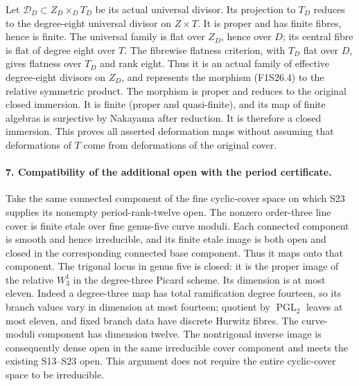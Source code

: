 Let $\mathcal D_D\subset Z_D\times_D T_D$ be its actual
universal divisor. Its projection to $T_D$ reduces to
the degree-eight universal divisor on $Z\times T$.
It is proper and has finite fibres, hence is finite.
The universal family is flat over $Z_D$, hence over $D$;
its central fibre is flat of degree eight over $T$.
The fibrewise flatness criterion, with $T_D$ flat over
$D$, gives flatness over $T_D$ and rank eight. Thus it
is an actual family of effective degree-eight divisors
on $Z_D$, and represents the morphism (F1S26.4) to the
relative symmetric product. The morphism is proper and
reduces to the original closed immersion. It is finite
(proper and quasi-finite), and its map of finite algebras
is surjective by Nakayama after reduction. It is therefore
a closed immersion. This proves all asserted deformation
maps without assuming that deformations of $T$ come from
deformations of the original cover.

\paragraph{7. Compatibility of the additional open with the period certificate.}
Take the same connected component of the fine cyclic-cover
space on which S23 supplies its nonempty period-rank-twelve
open. The nonzero order-three line cover is finite etale
over fine genus-five curve moduli. Each connected component
is smooth and hence irreducible, and its finite etale image
is both open and closed in the corresponding connected
base component. Thus it maps onto that component. The
trigonal locus in genus five is closed: it is the proper
image of the relative $W^1_3$ in the degree-three Picard
scheme. Its dimension is at most eleven. Indeed a degree-three
map has total ramification degree fourteen, so its branch
values vary in dimension at most fourteen; quotient by
$\operatorname{PGL}_2$ leaves at most eleven, and fixed
branch data have discrete Hurwitz fibres. The curve-moduli
component has dimension twelve. The nontrigonal inverse
image is consequently dense open in the same irreducible
cover component and meets the existing S13--S23 open.
This argument does not require the entire cyclic-cover
space to be irreducible.

